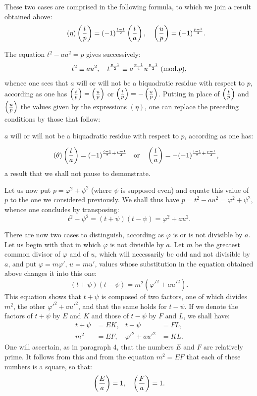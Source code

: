 \par\indent
These two cases are comprised in the following formula, to which we
join a result obtained above:
\begin{equation*}\tag{$\eta$}
\left(\frac{t}{p}\right)=(-1)^{\frac{t-1}{2}}\left(\frac{t}{a}\right),\quad
\left(\frac{u}{p}\right)=(-1)^{\frac{p-1}{4}}.
\end{equation*}
\par\indent
The equation $t^2-au^2=p$ gives successively:
\[
t^2\equiv au^2,\quad t^{\frac{p-1}{2}}\equiv a^{\frac{p-1}{4}}u^{\frac{p-1}{2}}\;(\mathrm{mod}.p),
\]
whence one sees that $a$ will or will not be a biquadratic residue with respect to
$p$, according as one has $\left(\frac{t}{p}\right)=\left(\frac{u}{p}\right)$ or $\left(\frac{t}{p}\right)=-\left(\frac{u}{p}\right)$.
Putting in place of $\left(\frac{t}{p}\right)$ and $\left(\frac{u}{p}\right)$ the values given by the
expressions $(\eta)$, one can replace the preceding conditions by those that follow:
\par\noindent\hspace*{.12\linewidth}\begin{minipage}{.86\linewidth}
$a$ will or will not be a biquadratic residue with respect to $p$, according as one has:
\end{minipage}
\begin{equation*}\tag{$\theta$}
\left(\frac{t}{a}\right)=(-1)^{\frac{t-1}{2}+\frac{p-1}{4}}\quad\text{or}\quad
\left(\frac{t}{a}\right)=-(-1)^{\frac{t-1}{2}+\frac{p-1}{4}},
\end{equation*}
\noindent
a result that we shall not pause to demonstrate.
\par\indent
Let us now put $p=\varphi^2+\psi^2$ (where $\psi$ is supposed even) and equate this
value of $p$ to the one we considered previously. We shall thus have
$p=t^2-au^2=\varphi^2+\psi^2$, whence one concludes by transposing:
\[
t^2-\psi^2=(t+\psi)(t-\psi)=\varphi^2+au^2.
\]
\par\indent
There are now two cases to distinguish, according as $\varphi$ is or is not
divisible by $a$. Let us begin with that in which $\varphi$ is not divisible by $a$. Let
$m$ be the greatest common divisor of $\varphi$ and of $u$, which will necessarily be
odd and not divisible by $a$, and put $\varphi=m\varphi'$, $u=mu'$, values whose
substitution in the equation obtained above changes it into this one:
\[
(t+\psi)(t-\psi)=m^2(\varphi'^2+au'^2).
\]
This equation shows that $t+\psi$ is composed of two factors, one of which
divides $m^2$, the other $\varphi'^2+au'^2$, and that the same holds for $t-\psi$. If we denote
the factors of $t+\psi$ by $E$ and $K$ and those of $t-\psi$ by $F$ and $L$, we shall have:
\[
\begin{aligned}
t+\psi&=EK, &t-\psi&=FL,\\
m^2&=EF, &\varphi'^2+au'^2&=KL.
\end{aligned}
\]
One will ascertain, as in paragraph 4, that the numbers $E$ and $F$ are
relatively prime. It follows from this and from the equation $m^2=EF$ that each of
these numbers is a square, so that:
\[
\left(\frac{E}{a}\right)=1,\quad\left(\frac{F}{a}\right)=1.
\]
